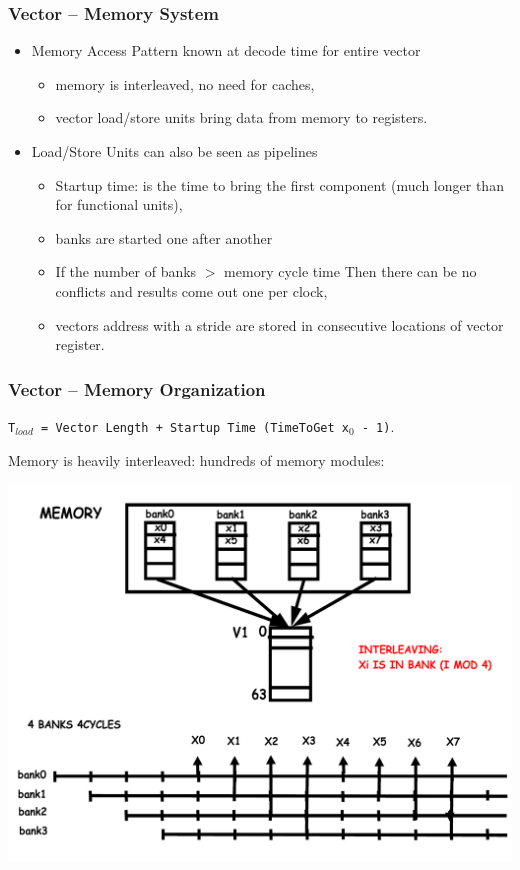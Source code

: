 \documentclass{beamer}
\begin{document}
\begin{frame}[fragile,t]
\frametitle{Vector -- Memory System}

\begin{itemize}
    \item Memory Access Pattern known at decode time for entire vector\smallskip
    \begin{itemize}
        \item memory is interleaved, no need for caches,\smallskip
        \item vector load/store units bring data from memory to registers.
    \end  {itemize}\medskip

    \item Load/Store Units can also be seen as pipelines\smallskip
    \begin{itemize}
        \item Startup time: is the time to bring the first component
                (much longer than for functional units),\smallskip
        \item banks are started one after another\smallskip
        \item If the number of banks $>$ memory cycle time Then 
                there can be no conflicts and results come 
                out one per clock,\smallskip
        \item vectors address with a stride are stored in consecutive
                locations of vector register. 
    \end  {itemize}

\end  {itemize}
\end{frame}


\begin{frame}[fragile,t]
\frametitle{Vector -- Memory Organization}

{\tt T$_{load}$ = Vector Length + Startup Time (TimeToGet x$_0$ - 1)}.\medskip

Memory is heavily interleaved: hundreds of memory modules:

\includegraphics[width=53ex]{Ch1Figs/VectorMemBanksPipe}

\end{frame}
\end{document}
